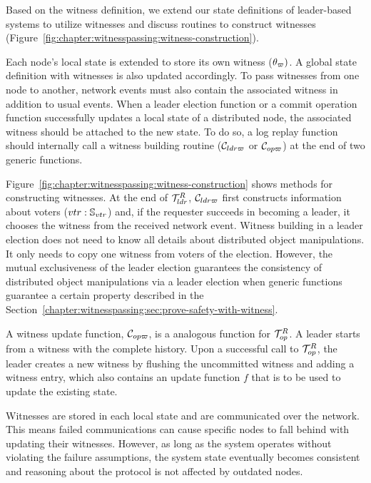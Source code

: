 Based on the witness definition, we extend our state definitions of
leader-based systems to utilize witnesses and discuss routines to construct
witnesses (Figure~\ref{fig:chapter:witnesspassing:witness-construction}).

Each node's local state is extended to store its own witness ($\theta_\varpi)$.
A global state definition with witnesses is also updated accordingly.
To pass witnesses from one node to another,
network events must also contain the associated witness in addition to usual events.
When a leader election function or a commit operation function successfully updates a local state of a distributed node, the associated witness should be
attached to the new state. To do so, a log replay function should internally call a witness building routine ($\mathcal{C}_{ldr\varpi}$ or $\mathcal{C}_{op\varpi}$) at the end of two generic functions.

Figure~\ref{fig:chapter:witnesspassing:witness-construction} shows methods for constructing witnesses.
At the end of $\mathcal{T}^{R}_{ldr}$, $\mathcal{C}_{ldr\varpi}$ first constructs information about voters ($vtr:\mathbb{S}_{vtr}$) and, if the requester succeeds in becoming a leader,
it chooses the witness from the received network event. 
Witness building in a leader election does not need to know 
all details about distributed object manipulations.
It only needs to copy one witness from voters of the election.
However, the mutual exclusiveness of the leader election guarantees the consistency of distributed object manipulations via a leader election when generic functions guarantee a 
 certain property described in the Section~\ref{chapter:witnesspassing:sec:prove-safety-with-witness}. 
 
A witness update function, $\mathcal{C}_{op\varpi}$, is a analogous function for $\mathcal{T}^{R}_{op}$.
A leader starts from a witness with the complete history.
Upon a successful call to $\mathcal{T}^{R}_{op}$, the leader creates a new witness by flushing the uncommitted witness and 
adding a witness entry, which also contains an update function $f$ that is to be used
to update the existing state.




Witnesses are stored in each local state and are communicated over the network.
This means failed communications can
cause specific nodes to fall behind with updating their witnesses.
However, as long as the system operates without violating the failure 
assumptions, the system state eventually becomes consistent and reasoning 
about the protocol is not affected by outdated nodes.

